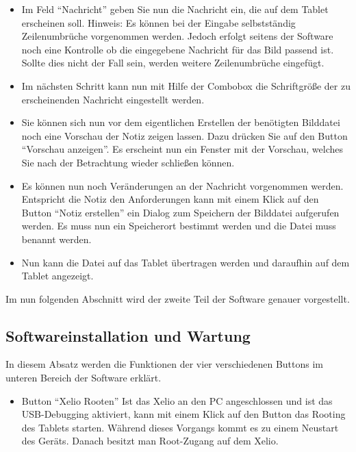 \begin{flushleft}
\begin{itemize}
  \item Im Feld ``Nachricht'' geben Sie nun die Nachricht ein, die auf dem Tablet erscheinen soll. 
    \subitem Hinweis: Es können bei der Eingabe selbstständig Zeilenumbrüche vorgenommen werden. Jedoch erfolgt seitens der Software noch 	  	 eine Kontrolle ob die eingegebene Nachricht für das Bild passend ist. Sollte dies nicht der Fall sein, werden weitere 	
	     Zeilenumbrüche eingefügt.  
	     
  \item Im nächsten Schritt kann nun mit Hilfe der Combobox die Schriftgröße der zu erscheinenden Nachricht eingestellt werden. 
  
  \item Sie können sich nun vor dem eigentlichen Erstellen der benötigten Bilddatei noch eine Vorschau der Notiz zeigen lassen. Dazu drücken   
        Sie auf den Button ``Vorschau anzeigen''. Es erscheint nun ein Fenster mit der Vorschau, welches Sie nach der Betrachtung wieder schließen können.
        
  \item Es können nun noch Veränderungen an der Nachricht vorgenommen werden. Entspricht die Notiz den Anforderungen kann mit einem Klick 	
	auf den Button ``Notiz erstellen'' ein Dialog zum Speichern der Bilddatei aufgerufen werden. Es muss nun ein Speicherort bestimmt werden und die Datei muss benannt werden. 
	
  \item Nun kann die Datei auf das Tablet übertragen werden und daraufhin auf dem Tablet angezeigt. 
\end{itemize}

Im nun folgenden Abschnitt wird der zweite Teil der Software genauer vorgestellt.

\subsection{Softwareinstallation und Wartung}
In diesem Absatz werden die Funktionen der vier verschiedenen Buttons im unteren Bereich der Software erklärt.

\begin{itemize}
  \item Button ``Xelio Rooten''
    \subitem Ist das Xelio an den PC angeschlossen und ist das USB-Debugging aktiviert, kann mit einem Klick auf den Button das Rooting des 	
	     Tablets starten. Während dieses Vorgangs kommt es zu einem Neustart des Geräts. Danach besitzt man Root-Zugang auf dem Xelio.
	     

\end{itemize}
\end{flushleft}
